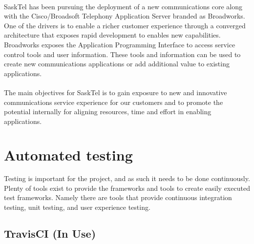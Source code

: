 \documentclass[12pt]{article}
\begin{document}
\paragraph{} 
	SaskTel has been pursuing the deployment of a new communications core along with the Cisco/Broadsoft Telephony Application Server branded as Broadworks.  One of the drivers is to enable a richer customer experience through a converged architecture that exposes rapid development to enables new capabilities.  Broadworks exposes the Application Programming Interface to access service control tools and user information.  These tools and information can be used to create new communications applications or add additional value to existing applications.  
\paragraph{} 
	The main objectives for SaskTel is to gain exposure to new and innovative communications service experience for our customers and to promote the potential internally for aligning resources, time and effort in enabling applications.

\section{Automated testing}
\paragraph{}	Testing is important for the project, and as such it needs to be done continuously. Plenty of tools exist to provide the frameworks and tools to create easily executed test frameworks. Namely there are tools that provide continuous integration testing, unit testing, and user experience testing. 

\subsection{TravisCI (In Use)}
\end{document}
